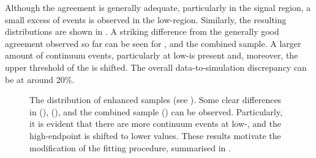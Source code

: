 Although the agreement is generally adequate, particularly in the signal region, a small excess of events is observed in the low-\EB region.
Similarly, the resulting \Mbc distributions are shown in .
A striking difference from the generally good agreement observed so far can be seen for \feiBp, \feiBz and the combined sample.
A larger amount of continuum events, particularly at low-\Mbc is present and,
moreover, the upper threshold of the \Mbc is shifted.
The overall data-to-simulation discrepancy can be at around 20\%.
\begin{figure}[htbp!]
    \centering
    \caption{\label{fig:qqbar_enhanced_mbc}
    The \Mbc distribution of \qqbar enhanced samples (see ).
    Some clear differences in \feiBp (), \feiBz (),
    and the combined sample () can be observed.
    Particularly, it is evident that there are more continuum events at low-\Mbc, 
    and the \Mbc high-endpoint is shifted to lower values.
    These results motivate the modification of the \Mbc fitting procedure, 
    summarised in .
    }
\end{figure}

